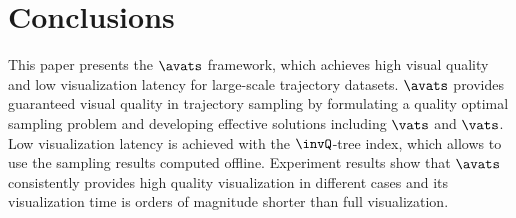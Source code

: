 \section{Conclusions}\label{sec:con}


This paper presents the $\avats$ framework, which achieves high visual quality and low visualization latency for large-scale trajectory datasets. $\avats$ provides guaranteed visual quality in trajectory sampling by formulating a quality optimal sampling problem and developing effective solutions including $\vats$ and $\vats$. Low visualization latency is achieved with the $\invQ$-tree index, which allows to use the sampling results computed offline. Experiment results show that $\avats$ consistently provides high quality visualization in different cases and its visualization time is orders of magnitude shorter than full visualization.


